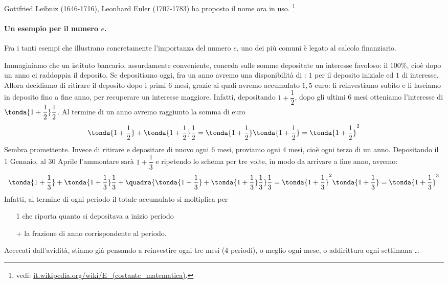 \noindent Gottfried Leibniz (1646-1716), Leonhard Euler (1707-1783) ha 
proposto il nome ora in uso.
\footnote{vedi: 
\href{https://it.wikipedia.org/wiki/E\_(costante\_matematica)}
     {it.wikipedia.org/wiki/E\_(costante\_matematica)}. 
}

\paragraph{Un esempio per il numero \(e\).}

Fra i tanti esempi che illustrano concretamente l'importanza del numero \(e\), 
uno dei più comuni è legato al calcolo finanziario.

Immaginiamo che un istituto bancario, assurdamente conveniente, conceda sulle 
somme depositate un interesse favoloso: il \(100\%\), cioè dopo un 
anno ci raddoppia il deposito. Se depositiamo  oggi, fra un anno avremo una 
disponibilità di : \(1\) per il deposito iniziale ed \(1\) di 
interesse. 
Allora decidiamo di ritirare il deposito dopo i primi \(6\) mesi, grazie ai 
quali avremo accumulato \(1,5\) euro: li reinvestiamo subito e li
lasciamo in deposito fino a fine anno, per recuperare un interesse maggiore. 
Infatti, depositando \(1+\dfrac{1}{2}\), dopo gli ultimi 6 mesi otteniamo 
l'interesse di \(\tonda{1+\dfrac{1}{2}}\dfrac{1}{2}\). Al termine di un anno 
avremo raggiunto la somma di euro
\[\tonda{1+\dfrac{1}{2}}+\tonda{1+\dfrac{1}{2}}\dfrac{1}{2}=\tonda{1+\dfrac{1}{2
}}\tonda{1+\dfrac{1}{2}}=\tonda{1+\dfrac{1}{2}}^2\]
Sembra promettente. Invece di ritirare e depositare di nuovo ogni 6 mesi, 
proviamo ogni 4 mesi, cioè ogni terzo di un anno. Depositando  il 1 
Gennaio, al 30 Aprile l'ammontare sarà \( 1+\dfrac{1}{3}\) e ripetendo lo 
schema per tre volte, in modo da arrivare a fine anno, avremo:
\[
 \tonda{1+\dfrac{1}{3}}+\tonda{1+\dfrac{1}{3}}\dfrac{1}{3}+ 
\quadra{\tonda{1+\dfrac{1}{3}}+\tonda{1+\dfrac{1}{3}}\dfrac{1}{3}}\dfrac{1}{3}=
\tonda{1+\dfrac{1}{3}}^2\tonda{1+\dfrac{1}{3}}= 
\tonda{1+\dfrac{1}{3}}^3
\]
Infatti, al termine di ogni periodo il totale accumulato si moltiplica per
\begin{itemize}[nosep, noitemsep]
 \item [1]che riporta quanto si depositava a inizio periodo
 \item [+]la frazione di anno corrispondente al periodo.
\end{itemize}
Accecati dall'avidità, stiamo già pensando a reinvestire ogni tre mesi (4 
periodi), o meglio ogni mese, o addirittura ogni settimana \dots 

